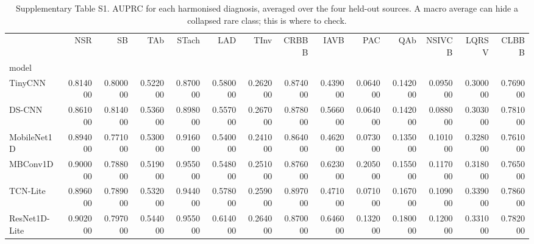 \begin{table}
\caption{Supplementary Table S1. AUPRC for each harmonised diagnosis, averaged over the four held-out sources. A macro average can hide a collapsed rare class; this is where to check.}
\begin{tabular}{lrrrrrrrrrrrrr}
\toprule
 & NSR & SB & TAb & STach & LAD & TInv & CRBBB & IAVB & PAC & QAb & NSIVCB & LQRSV & CLBBB \\
model &  &  &  &  &  &  &  &  &  &  &  &  &  \\
\midrule
TinyCNN & 0.814000 & 0.800000 & 0.522000 & 0.870000 & 0.580000 & 0.262000 & 0.874000 & 0.439000 & 0.064000 & 0.142000 & 0.095000 & 0.300000 & 0.769000 \\
DS-CNN & 0.861000 & 0.814000 & 0.536000 & 0.898000 & 0.557000 & 0.267000 & 0.878000 & 0.566000 & 0.064000 & 0.142000 & 0.088000 & 0.303000 & 0.781000 \\
MobileNet1D & 0.894000 & 0.771000 & 0.530000 & 0.916000 & 0.540000 & 0.241000 & 0.864000 & 0.462000 & 0.073000 & 0.135000 & 0.101000 & 0.328000 & 0.761000 \\
MBConv1D & 0.900000 & 0.788000 & 0.519000 & 0.955000 & 0.548000 & 0.251000 & 0.876000 & 0.623000 & 0.205000 & 0.155000 & 0.117000 & 0.318000 & 0.765000 \\
TCN-Lite & 0.896000 & 0.789000 & 0.532000 & 0.944000 & 0.578000 & 0.259000 & 0.897000 & 0.471000 & 0.071000 & 0.167000 & 0.109000 & 0.339000 & 0.786000 \\
ResNet1D-Lite & 0.902000 & 0.797000 & 0.544000 & 0.955000 & 0.614000 & 0.264000 & 0.870000 & 0.646000 & 0.132000 & 0.180000 & 0.120000 & 0.331000 & 0.782000 \\
\bottomrule
\end{tabular}
\end{table}
